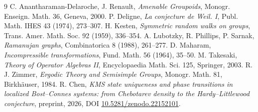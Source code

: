 \documentclass[11pt]{amsart}
\numberwithin{equation}{section}
\theoremstyle{definition}
\theoremstyle{remark}
\begin{document}
\begin{thebibliography}{9}
 C. Anantharaman-Delaroche, J. Renault, \emph{Amenable Groupoids}, Monogr. Enseign. Math. 36, Geneva, 2000.
 P. Deligne, \emph{La conjecture de Weil. I}, Publ. Math. IHES 43 (1974), 273--307.
 H. Kesten, \emph{Symmetric random walks on groups}, Trans. Amer. Math. Soc. 92 (1959), 336--354.
 A. Lubotzky, R. Phillips, P. Sarnak, \emph{Ramanujan graphs}, Combinatorica 8 (1988), 261--277.
 D. Maharam, \emph{Incompressible transformations}, Fund. Math. 56 (1964), 35--50.
 M. Takesaki, \emph{Theory of Operator Algebras II}, Encyclopaedia Math. Sci. 125, Springer, 2003.
 R. J. Zimmer, \emph{Ergodic Theory and Semisimple Groups}, Monogr. Math. 81, Birkh\"auser, 1984.
 R. Chen, \emph{KMS state uniqueness and phase transitions in localized Bost--Connes systems: from Chebotarev density to the Hardy--Littlewood conjecture}, preprint, 2026, DOI \href{https://doi.org/10.5281/zenodo.22152101}{10.5281/zenodo.22152101}.
\end{thebibliography}
\end{document}

